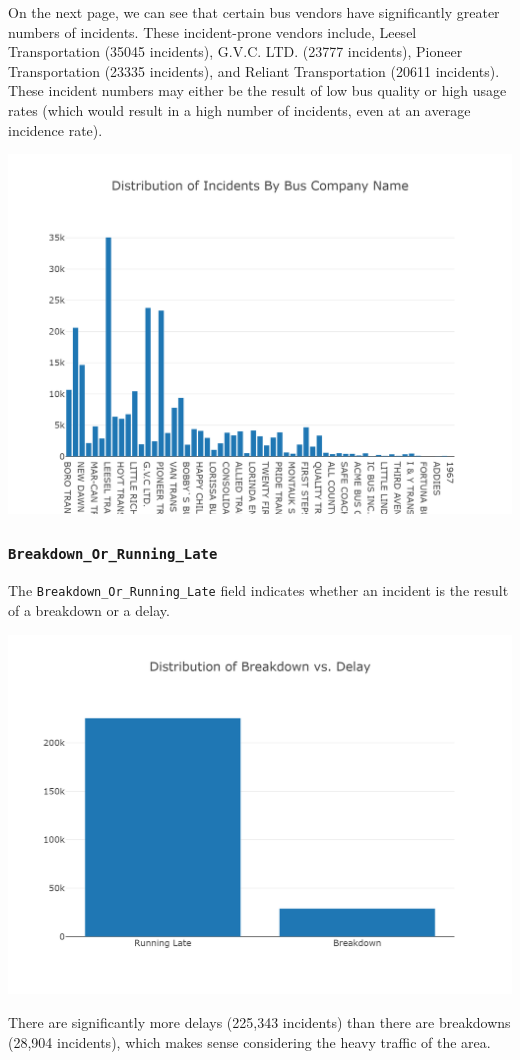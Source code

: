 \documentclass[11pt]{article}
\begin{document}
On the next page, we can see that certain bus vendors have significantly greater numbers of incidents. These incident-prone vendors include, Leesel Transportation (35045 incidents), G.V.C. LTD. (23777 incidents), Pioneer Transportation (23335 incidents), and Reliant Transportation (20611 incidents). These incident numbers may either be the result of low bus quality or high usage rates (which would result in a high number of incidents, even at an average incidence rate).
\begin{center}
\includegraphics[width=5.25in]{images/bus_company_name.png}
\end{center}

\subsubsection{\texttt{Breakdown\_Or\_Running\_Late}}
The \texttt{Breakdown\_Or\_Running\_Late} field indicates whether an incident is the result of a breakdown or a delay.
\begin{center}
\includegraphics[width=5.25in]{images/breakdown_vs_delay.png}
\end{center}
There are significantly more delays (225,343 incidents) than there are breakdowns (28,904 incidents), which makes sense considering the heavy traffic of the area.
\end{document}
